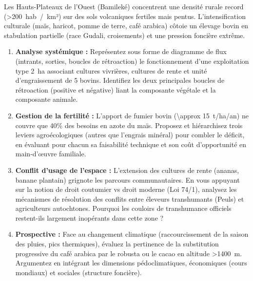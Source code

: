 \documentclass[11pt]{article}
\begin{document}
\begin{exercice}
Les Hauts-Plateaux de l'Ouest (Bamileké) concentrent une densité rurale record (\SI{>200}{hab./km²}) sur des sols volcaniques fertiles mais pentus. L'intensification culturale (maïs, haricot, pomme de terre, café arabica) côtoie un élevage bovin en stabulation partielle (race Gudali, croisements) et une pression foncière extrême.
\begin{enumerate}
    \item \textbf{Analyse systémique :} Représentez sous forme de diagramme de flux (intrants, sorties, boucles de rétroaction) le fonctionnement d'une exploitation type \SI{2}{ha} associant cultures vivrières, cultures de rente et unité d'engraissement de 5 bovins. Identifiez les deux principales boucles de rétroaction (positive et négative) liant la composante végétale et la composante animale.
    \item \textbf{Gestion de la fertilité :} L'apport de fumier bovin (\SI{\approx 15}{t/ha/an}) ne couvre que 40\% des besoins en azote du maïs. Proposez et hiérarchisez trois leviers agroécologiques (autres que l'engrais minéral) pour combler le déficit, en évaluant pour chacun sa faisabilité technique et son coût d'opportunité en main-d'œuvre familiale.
    \item \textbf{Conflit d'usage de l'espace :} L'extension des cultures de rente (ananas, banane plantain) grignote les parcours communautaires. En vous appuyant sur la notion de \og droit coutumier \fg vs \og droit moderne \fg (Loi 74/1), analysez les mécanismes de résolution des conflits entre éleveurs transhumants (Peuls) et agriculteurs autochtones. Pourquoi les \og couloirs de transhumance \fg officiels restent-ils largement inopérants dans cette zone ?
    \item \textbf{Prospective :} Face au changement climatique (raccourcissement de la saison des pluies, pics thermiques), évaluez la pertinence de la substitution progressive du café arabica par le robusta ou le cacao en altitude \SI{>1400}{m}. Argumentez en intégrant les dimensions pédoclimatiques, économiques (cours mondiaux) et sociales (structure foncière).
\end{enumerate}
\end{exercice}
\end{document}

